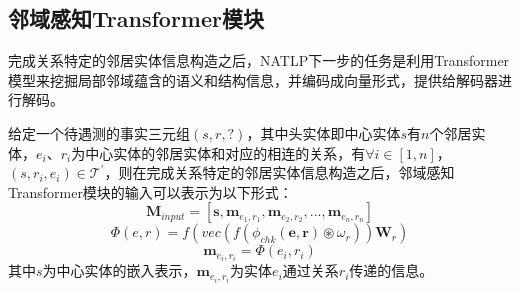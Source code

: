 \subsection{邻域感知Transformer模块}

完成关系特定的邻居实体信息构造之后，NATLP下一步的任务是利用Transformer模型来挖掘局部邻域蕴含的语义和结构信息，并编码成向量形式，提供给解码器进行解码。

给定一个待遇测的事实三元组$(s,r,?)$，其中头实体即中心实体$s$有$n$个邻居实体，$e_i$、$r_i$为中心实体的邻居实体和对应的相连的关系，有$\forall  i\in\left[1,n\right] $，$(s,r_i,e_i) \in \mathcal{T}^\prime $，则在完成关系特定的邻居实体信息构造之后，邻域感知Transformer模块的输入可以表示为以下形式：
\begin{equation}
      \mathbf{M}_{input}=\left[\boldsymbol{s},\boldsymbol{m}_{e_1,r_1},\boldsymbol{m}_{e_2,r_2},...,\boldsymbol{m}_{e_n,r_n}\right]
\end{equation}
\begin{equation}
  \varPhi \left(e,r\right) = f\left(vec\left(f\left(\phi_{chk}\left(\boldsymbol{e},\boldsymbol{r}\right) \circledast \omega_{r} \right)\right)\mathbf{W}_{r}\right)
\end{equation}
\begin{equation}
    \boldsymbol{m}_{e_i,r_i}=\varPhi \left(e_i,r_i\right)
\end{equation}
其中$s$为中心实体的嵌入表示，$\boldsymbol{m}_{e_i,r_i}$为实体$e_i$通过关系$r_i$传递的信息。

